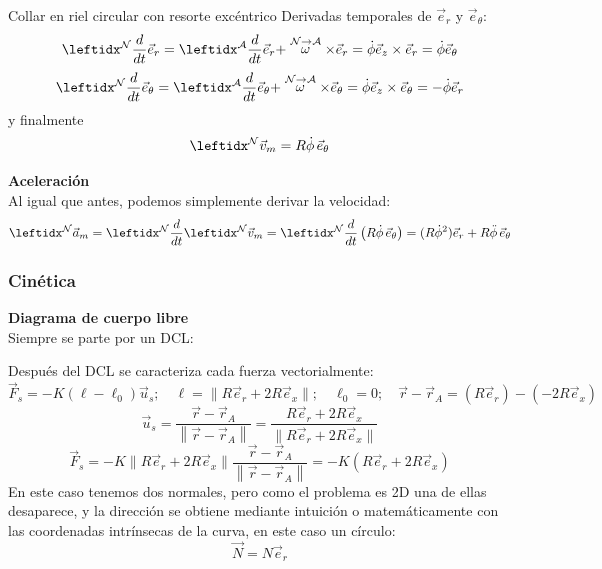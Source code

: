 \begin{solucion}{Collar en riel circular con resorte excéntrico}
Derivadas temporales de $\vec{e}_r$ y $\vec{e}_\theta$:
$$\transport{\vec{e}_r}{N}{A}=\dot\phi\vec{e}_z\times\vec{e}_r=\dot\phi\vec{e}_\theta$$
$$\transport{\vec{e}_\theta}{N}{A}=\dot\phi\vec{e}_z\times\vec{e}_\theta=-\dot\phi\vec{e}_r$$
y finalmente
$$\marc{\vec{v}_m}{N}=R\dot\phi\,\vec{e}_\theta$$

\textbf{Aceleración}\\
Al igual que antes, podemos simplemente derivar la velocidad:
$$\marc{\vec{a}_m}{N}=\der{\marc{\vec{v}_m}{N}{}}{N}{}=\der{\left(R\dot\phi\,\vec{e}_\theta\right)}{N}{}=(R\dot\phi^2)\vec{e}_r+ R\ddot\phi\,\vec{e}_{\theta}$$

\subsubsection*{Cinética}
\textbf{Diagrama de cuerpo libre}\\
Siempre se parte por un DCL:
\begin{center}
\end{center}
Después del DCL se caracteriza cada fuerza vectorialmente:
$$\vec{F}_s=-K(\ell-\ell_0)\vec{u}_s;\quad \ell=\|R\vec{e}_r+2R\vec{e}_x\|;\quad\ell_0=0;\quad\vec{r}-\vec{r}_A=(R\vec{e}_r)-(-2R\vec{e}_x)$$
$$\vec{u}_s = \frac{\vec{r} - \vec{r}_A}{\left\lVert \vec{r} - \vec{r}_A \right\rVert}=\frac{R\vec{e}_r+2R\vec{e}_x}{\|R\vec{e}_r+2R\vec{e}_x\|}$$
$$\vec{F}_s=-K\|R\vec{e}_r+2R\vec{e}_x\|\frac{\vec{r} - \vec{r}_A}{\left\lVert \vec{r} - \vec{r}_A \right\rVert}=-K(R\vec{e}_r+2R\vec{e}_x)$$
En este caso tenemos dos normales, pero como el problema es 2D una de ellas desaparece, y la dirección se obtiene mediante intuición o matemáticamente con las coordenadas intrínsecas de la curva, en este caso un círculo:
$$\vec{N}=N\vec{e}_r$$


\end{solucion}
